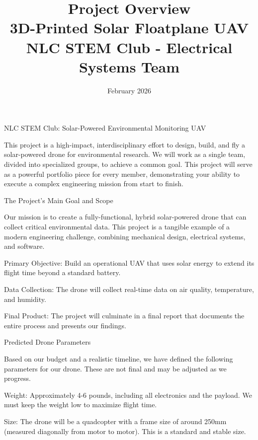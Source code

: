 \documentclass[11pt,letterpaper]{article}
\title{\Huge\textbf{Project Overview}\\
\Large 3D-Printed Solar Floatplane UAV\\
\large NLC STEM Club - Electrical Systems Team}
\author{February 2026}
\date{}
\begin{document}
\maketitle
\thispagestyle{empty}
\newpage
NLC STEM Club: Solar-Powered Environmental Monitoring UAV\par

This project is a high-impact, interdisciplinary effort to design, build, and fly a solar-powered drone for environmental research. We will work as a single team, divided into specialized groups, to achieve a common goal. This project will serve as a powerful portfolio piece for every member, demonstrating your ability to execute a complex engineering mission from start to finish.\par

The Project's Main Goal and Scope\par

Our mission is to create a fully-functional, hybrid solar-powered drone that can collect critical environmental data. This project is a tangible example of a modern engineering challenge, combining mechanical design, electrical systems, and software.\par

Primary Objective: Build an operational UAV that uses solar energy to extend its flight time beyond a standard battery.\par

Data Collection: The drone will collect real-time data on air quality, temperature, and humidity.\par

Final Product: The project will culminate in a final report that documents the entire process and presents our findings.\par

Predicted Drone Parameters\par

Based on our budget and a realistic timeline, we have defined the following parameters for our drone. These are not final and may be adjusted as we progress.\par

Weight: Approximately 4-6 pounds, including all electronics and the payload. We must keep the weight low to maximize flight time.\par

Size: The drone will be a quadcopter with a frame size of around 250mm (measured diagonally from motor to motor). This is a standard and stable size.\par
\end{document}
